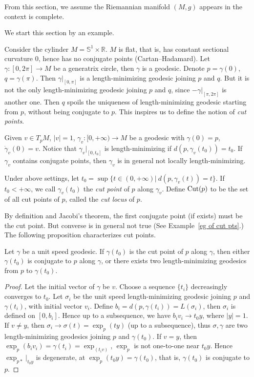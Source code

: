 From this section, we assume the Riemannian manifold $(M,g)$ appears in the context is complete.

We start this section by an example.

\begin{eg}
    Consider the cylinder $M=\mathbb{S}^1\times\mathbb{R}$.
    $M$ is flat, that is, has constant sectional curvature $0$, hence has no conjugate points (Cartan--Hadamard).
    Let $\gamma:[0,2\pi]\to M$ be a generatrix circle, then $\gamma$ is a geodesic.
    Denote $p=\gamma(0)$, $q=\gamma(\pi)$.
    Then $\gamma|_{[0,\pi]}$ is a length-minimizing geodesic joining $p$ and $q$.
    But it is not the only length-minimizing geodesic joining $p$ and $q$, since $-\gamma|_{[\pi,2\pi]}$ is another one.
    Then $q$ spoils the uniqueness of length-minimizing geodesic starting from $p$, without being conjugate to $p$.
    This inspires us to define the notion of \emph{cut points}.
\end{eg}

Given $v\in T_pM$, $|v|=1$, $\gamma_v:[0,+\infty)\to M$ be a geodesic with $\gamma(0)=p$, $\dot{\gamma}_v(0)=v$.
Notice that $\gamma_v|_{[0,t_0]}$ is length-minimizing if $d(p,\gamma_v(t_0))=t_0$.
If $\gamma_v$ contains conjugate points, then $\gamma_v$ is in general not locally length-minimizing.

\begin{defn}
    Under above settings, let $t_0=\sup\{t\in(0,+\infty)|\ d(p,\gamma_v(t))=t\}$.
    If $t_0<+\infty$, we call $\gamma_v(t_0)$ the \emph{cut point} of $p$ along $\gamma_v$.
    Define $\operatorname{Cut}(p)$ to be the set of all cut points of $p$, called the \emph{cut locus} of $p$.
\end{defn}

By definition and Jacobi's theorem, the first conjugate point (if exists) must be the cut point.
But converse is in general not true (See Example~\ref{eg of cut pts}.)
The following proposition characterizes cut points.

\begin{prop}
    Let $\gamma$ be a unit speed geodesic.
    If $\gamma(t_0)$ is the cut point of $p$ along $\gamma$, then either $\gamma(t_0)$ is conjugate to $p$ along $\gamma$, or there exists two length-minimizing geodesics from $p$ to $\gamma(t_0)$.
\end{prop}
\begin{proof}
    Let the initial vector of $\gamma$ be $v$.
    Choose a sequence $\{t_i\}$ decreasingly converges to $t_0$.
    Let $\sigma_i$ be the unit speed length-minimizing geodesic joining $p$ and $\gamma(t_i)$, with initial vector $v_i$.
    Define $b_i=d(p,\gamma(t_i))=L(\sigma_i)$, then $\sigma_i$ is defined on $[0,b_i]$.
    Hence up to a subsequence, we have $b_iv_i\to t_0y$, where $|y|=1$.
    If $v\neq y$, then $\sigma_i\to\sigma(t)=\exp_p(ty)$ (up to a subsequence), thus $\sigma,\gamma$ are two length-minimizing geodesics joining $p$ and $\gamma(t_0)$.
    If $v=y$, then $\exp_p(b_iv_i)=\gamma(t_i)=\exp_(t_iv)$, $\exp_p$ is not one-to-one near $t_0y$.
    Hence $\exp_{p*}|_{t_0y}$ is degenerate, at $\exp_p(t_0y)=\gamma(t_0)$, that is, $\gamma(t_0)$ is conjugate to $p$.
\end{proof}

